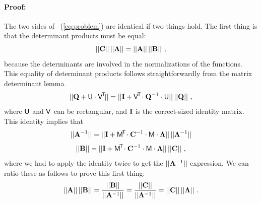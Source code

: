 \paragraph{Proof:}
The two sides of \equationname~(\ref{eq:problem}) are identical if two things
hold.
The first thing is that the determinant products must be equal:
\begin{equation}
||\mathbf{C}||\,||\mathbf{\Lambda}|| = ||\mathbf{A}||\,||\mathbf{B}||
~ ,
\end{equation}
because the determinants are involved in the normalizations of the
functions.
This equality of determinant products follows straightforwardly from
the matrix determinant lemma
\begin{equation}\label{eq:detlemma}
||\mathbf{Q} + \mathsf{U}\cdot\mathsf{V}^{\!\mathsf{T}\!}|| = ||\mathbf{I} + \mathsf{V}^{\!\mathsf{T}\!}\cdot\mathbf{Q}^{-1}\cdot\mathsf{U}||\,||\mathbf{Q}||
~ ,
\end{equation}
where $\mathsf{U}$ and $\mathsf{V}$ can be rectangular, and $\mathbf{I}$ is the correct-sized identity matrix.
This identity implies that
\begin{equation}
||\mathbf{A}^{-1}|| = ||\mathbf{I} + \mathsf{M}^{\!\mathsf{T}\!}\cdot\mathbf{C}^{-1}\cdot\mathsf{M}\cdot\mathbf{\Lambda}||\,||\mathbf{\Lambda}^{-1}||
\end{equation}
\begin{equation}
||\mathbf{B}||     = ||\mathbf{I} + \mathsf{M}^{\!\mathsf{T}\!}\cdot\mathbf{C}^{-1}\cdot\mathsf{M}\cdot\mathbf{\Lambda}||\,||\mathbf{C}||
~,
\end{equation}
where we had to apply the identity twice to get the $||\mathbf{A}^{-1}||$ expression.
We can ratio these as follows to prove this first thing:
\begin{equation}
||\mathbf{A}||\,||\mathbf{B}||
 = \frac{||\mathbf{B}||}{||\mathbf{A}^{-1}||}
 = \frac{||\mathbf{C}||}{||\mathbf{\Lambda}^{-1}||}
 = ||\mathbf{C}||\,||\mathbf{\Lambda}||
~ .
\end{equation}

